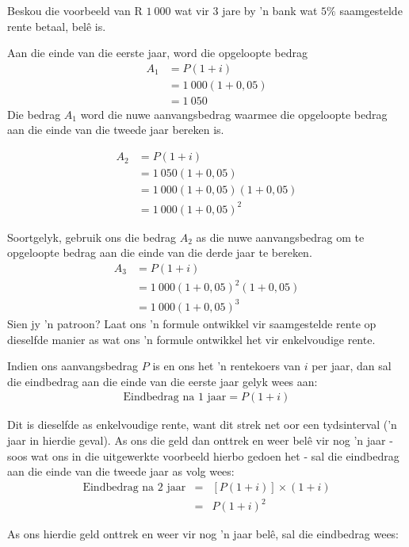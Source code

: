 Beskou die voorbeeld van R $1~000$ wat vir $3$ jare by 'n bank wat $5\%$ saamgestelde rente betaal, belê is.

Aan die einde van die eerste jaar, word die opgeloopte bedrag
\begin{align*}
  A_1 &= P(1 + i)\\
  &= 1~000(1+0,05)\\
  &=1~050
\end{align*}
Die bedrag $A_1$ word die nuwe aanvangsbedrag waarmee die opgeloopte bedrag aan die einde van die tweede jaar bereken is. 

\begin{align*}
    A_2 &= P(1 + i)\\
&= 1~050(1+0,05)\\
&=1~000(1+0,05)(1+0,05)\\
&= 1~000(1+0,05)^2
\end{align*}

Soortgelyk, gebruik ons die bedrag $A_2$ as die nuwe aanvangsbedrag om te opgeloopte bedrag aan die einde van die derde jaar te bereken.
\begin{align*}
    A_3 &= P(1 + i)\\
&=1~000(1+0,05)^2(1+0,05)\\
&= 1~000(1+0,05)^3
\end{align*}
Sien jy 'n patroon? Laat ons ’n formule ontwikkel vir saamgestelde rente op dieselfde manier as wat ons ’n formule ontwikkel het vir
enkelvoudige rente.\par

Indien ons aanvangsbedrag $P$ is en ons het ’n rentekoers van $i$ per jaar, dan sal die eindbedrag aan die einde
van die eerste jaar gelyk wees aan:
\begin{eqnarray*}
    \mbox{Eindbedrag na 1 jaar} = P(1 + i)
\end{eqnarray*}

Dit is dieselfde as enkelvoudige rente, want dit strek net oor een tydsinterval (’n jaar in hierdie geval). As ons die
geld dan onttrek en weer belê vir nog ’n jaar - soos wat ons in die uitgewerkte voorbeeld hierbo gedoen het - sal
die eindbedrag aan die einde van die tweede jaar as volg wees:
\begin{eqnarray*}
    \mbox{Eindbedrag na 2 jaar} &=& [P(1 + i)] \times (1 + i)\\
    &=& P(1 + i)^2
\end{eqnarray*}

As ons hierdie geld onttrek en weer vir nog ’n jaar belê, sal die eindbedrag wees:

